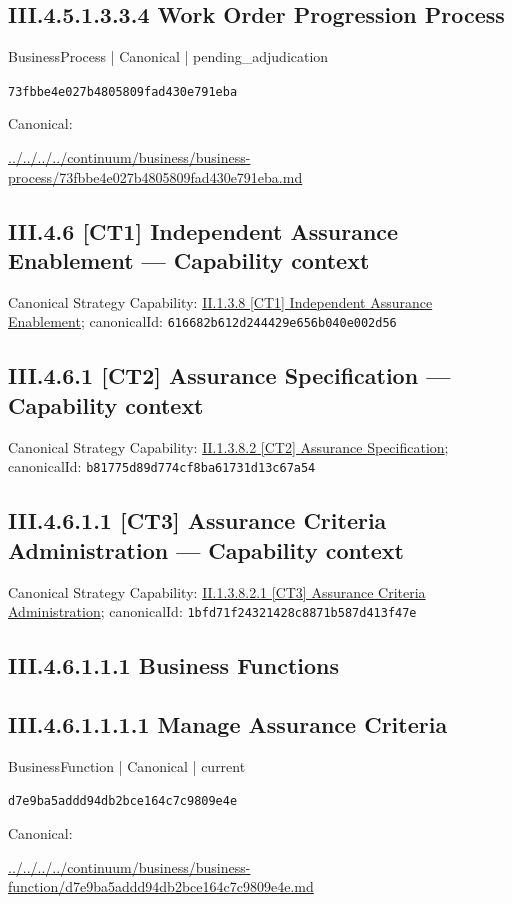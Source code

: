 \documentclass[10pt,a4paper]{article}
\begin{document}
\subsection*{III.4.5.1.3.3.4 Work Order Progression Process}
\label{element-73fbbe4e027b4805809fad430e791eba}
{\small BusinessProcess | Canonical | pending\_adjudication}\par
\texttt{73fbbe4e027b4805809fad430e791eba}\par
Canonical: \par
{\footnotesize\url{../../../../continuum/business/business-process/73fbbe4e027b4805809fad430e791eba.md}}\par
\subsection*{III.4.6 [CT1] Independent Assurance Enablement — Capability context}
Canonical Strategy Capability: \hyperref[element-616682b612d244429e656b040e002d56]{II.1.3.8 [CT1] Independent Assurance Enablement}; canonicalId: \texttt{616682b612d244429e656b040e002d56}\par
\subsection*{III.4.6.1 [CT2] Assurance Specification — Capability context}
Canonical Strategy Capability: \hyperref[element-b81775d89d774cf8ba61731d13c67a54]{II.1.3.8.2 [CT2] Assurance Specification}; canonicalId: \texttt{b81775d89d774cf8ba61731d13c67a54}\par
\subsection*{III.4.6.1.1 [CT3] Assurance Criteria Administration — Capability context}
Canonical Strategy Capability: \hyperref[element-1bfd71f24321428c8871b587d413f47e]{II.1.3.8.2.1 [CT3] Assurance Criteria Administration}; canonicalId: \texttt{1bfd71f24321428c8871b587d413f47e}\par
\subsection*{III.4.6.1.1.1 Business Functions}
\subsection*{III.4.6.1.1.1.1 Manage Assurance Criteria}
\label{element-d7e9ba5addd94db2bce164c7c9809e4e}
{\small BusinessFunction | Canonical | current}\par
\texttt{d7e9ba5addd94db2bce164c7c9809e4e}\par
Canonical: \par
{\footnotesize\url{../../../../continuum/business/business-function/d7e9ba5addd94db2bce164c7c9809e4e.md}}\par
\end{document}
